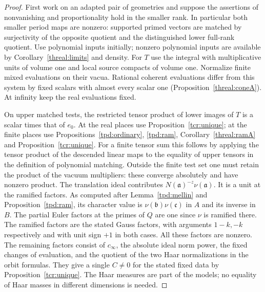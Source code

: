 \begin{proof}
First work on an adapted pair of geometries and suppose the
assertions of nonvanishing and proportionality hold in the smaller
rank. In particular both smaller period maps are nonzero: supported
primed vectors are matched by surjectivity of the opposite quotient
and the distinguished lower full-rank quotient. Use polynomial
inputs initially; nonzero polynomial inputs are available by
Corollary~\ref{threal:limits} and density. For \(T\) use the
integral with multiplicative units of volume one and local source
compacts of volume one. Normalize finite mixed evaluations on
their vacua. Rational coherent evaluations differ from this system
by fixed scalars with almost every scalar one
(Proposition~\ref{threal:coneA}). At infinity keep the real
evaluations fixed.

On upper matched tests, the restricted tensor product of lower
images of \(T\) is a scalar times that of \(e_0\). At the real
places use Proposition~\ref{tcr:unique}; at the finite places use
Propositions~\ref{tpd:ordinary}, \ref{tpd:ram},
Corollary~\ref{threal:ramA} and Proposition~\ref{tcr:unique}.
For a finite tensor sum this follows by applying the tensor product
of the descended linear maps to the equality of upper tensors in
the definition of polynomial matching. Outside the finite test set
one must retain the product of the vacuum multipliers: these
converge absolutely and have nonzero product. The translation
ideal contributes \(N(\mathfrak a)^{-z}\nu(\mathfrak a)\).
It is a unit at the ramified factors. As computed after
Lemma~\ref{tpd:mellin} and Proposition~\ref{tpd:ram}, its
character value is \(\nu(\mathfrak b)\nu(\mathfrak c)\) in \(A\)
and its inverse in \(B\). The partial Euler factors at the primes
of \(Q\) are one since \(\nu\) is ramified there. The ramified
factors are the stated Gauss factors, with arguments \(1-k,-k\)
respectively and with unit sign \(+1\) in both cases.
All these factors are nonzero. The remaining factors consist of
\(c_\infty\), the absolute ideal norm power, the fixed changes of
evaluation, and the quotient of the two Haar normalizations in
the orbit formulas. They give a single \(C\ne0\) for the stated
fixed data by Proposition~\ref{tcr:unique}. The Haar measures
are part of the models; no equality of Haar masses in different
dimensions is needed.


\end{proof}
